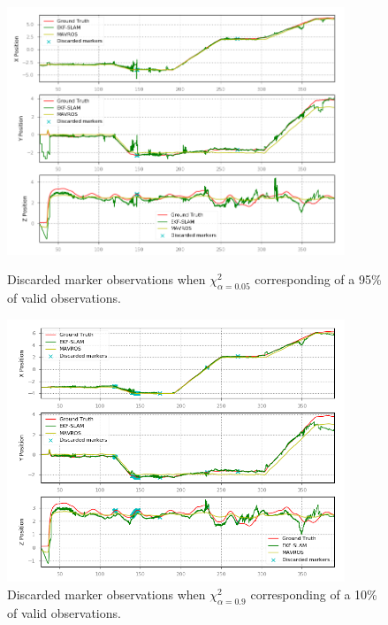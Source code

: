 \begin{figure}
    \centering
    \includegraphics[width=0.9\textwidth]{Images/fig24-nees-95-path-discarded-markers.png}
    \caption[Discarded marker observations when $\chi_{\alpha=0.05}^2$]{Discarded marker observations when $\chi_{\alpha=0.05}^2$ corresponding of a 95\% of valid observations.}
    \label{fig:chapter3:simulation:d:nees-95-discarded-markers}
    \centering
    \includegraphics[width=0.9\textwidth]{Images/fig24-nees-10-path-discarded-markers.png}
    \caption[Discarded marker observations when $\chi_{\alpha=0.9}^2$]{Discarded marker observations when $\chi_{\alpha=0.9}^2$ corresponding of a 10\% of valid observations.}
    \label{fig:chapter3:simulation:d:nees-10-discarded-markers}
\end{figure}

